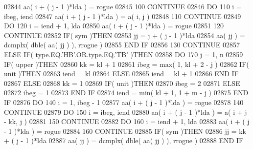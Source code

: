 \begin{DoxyCode}
02844                aa( i + ( j - 1 )*lda ) = rogue
02845   100       \textcolor{keywordflow}{CONTINUE}
02846             \textcolor{keywordflow}{DO} 110 i = ibeg, iend
02847                aa( i + ( j - 1 )*lda ) = a( i, j )
02848   110       \textcolor{keywordflow}{CONTINUE}
02849             \textcolor{keywordflow}{DO} 120 i = iend + 1, lda
02850                aa( i + ( j - 1 )*lda ) = rogue
02851   120       \textcolor{keywordflow}{CONTINUE}
02852             \textcolor{keywordflow}{IF}( sym )\textcolor{keywordflow}{THEN}
02853                jj = j + ( j - 1 )*lda
02854                aa( jj ) = dcmplx( dble( aa( jj ) ), rrogue )
02855 \textcolor{keywordflow}{            END IF}
02856   130    \textcolor{keywordflow}{CONTINUE}
02857       \textcolor{keywordflow}{ELSE} \textcolor{keywordflow}{IF}( type.EQ.\textcolor{stringliteral}{'HB'}.OR.type.EQ.\textcolor{stringliteral}{'TB'} )\textcolor{keywordflow}{THEN}
02858          \textcolor{keywordflow}{DO} 170 j = 1, n
02859             \textcolor{keywordflow}{IF}( upper )\textcolor{keywordflow}{THEN}
02860                kk = kl + 1
02861                ibeg = max( 1, kl + 2 - j )
02862                \textcolor{keywordflow}{IF}( unit )\textcolor{keywordflow}{THEN}
02863                   iend = kl
02864                \textcolor{keywordflow}{ELSE}
02865                   iend = kl + 1
02866 \textcolor{keywordflow}{               END IF}
02867             \textcolor{keywordflow}{ELSE}
02868                kk = 1
02869                \textcolor{keywordflow}{IF}( unit )\textcolor{keywordflow}{THEN}
02870                   ibeg = 2
02871                \textcolor{keywordflow}{ELSE}
02872                   ibeg = 1
02873 \textcolor{keywordflow}{               END IF}
02874                iend = min( kl + 1, 1 + m - j )
02875 \textcolor{keywordflow}{            END IF}
02876             \textcolor{keywordflow}{DO} 140 i = 1, ibeg - 1
02877                aa( i + ( j - 1 )*lda ) = rogue
02878   140       \textcolor{keywordflow}{CONTINUE}
02879             \textcolor{keywordflow}{DO} 150 i = ibeg, iend
02880                aa( i + ( j - 1 )*lda ) = a( i + j - kk, j )
02881   150       \textcolor{keywordflow}{CONTINUE}
02882             \textcolor{keywordflow}{DO} 160 i = iend + 1, lda
02883                aa( i + ( j - 1 )*lda ) = rogue
02884   160       \textcolor{keywordflow}{CONTINUE}
02885             \textcolor{keywordflow}{IF}( sym )\textcolor{keywordflow}{THEN}
02886                jj = kk + ( j - 1 )*lda
02887                aa( jj ) = dcmplx( dble( aa( jj ) ), rrogue )
02888 \textcolor{keywordflow}{            END IF}

\end{DoxyCode}
